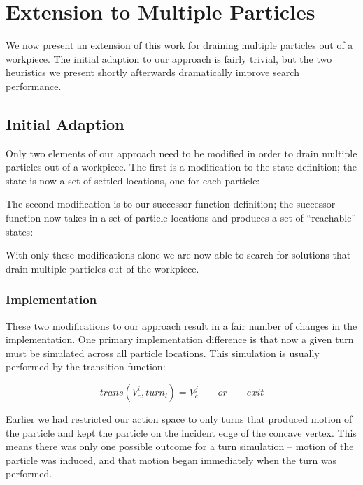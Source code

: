 \chapter{Extension to Multiple Particles}

We now present an extension of this work for draining multiple particles out of a workpiece. The initial adaption to our approach is fairly trivial, but the two heuristics we present shortly afterwards dramatically improve search performance.

\section{Initial Adaption}

Only two elements of our approach need to be modified in order to drain multiple particles out of a workpiece. The first is a modification to the state definition; the state is now a set of settled locations, one for each particle:

 {
  \label{eq:multipleParticleState}
}

The second modification is to our successor function definition; the successor function now takes in a set of particle locations and produces a set of ``reachable'' states:

 {
  \label{eq:successorMultipleParticle}
}

With only these modifications alone we are now able to search for solutions that drain multiple particles out of the workpiece.

\subsection{Implementation}

These two modifications to our approach result in a fair number of changes in the implementation. One primary implementation difference is that now a given turn must be simulated across all particle locations. This simulation is usually performed by the transition function:

$$
trans(V_{c}^{i}, turn_{l}) = V_{c}^j \qquad or \qquad exit
$$

Earlier we had restricted our action space to only turns that produced motion of the particle and kept the particle on the incident edge of the concave vertex. This means there was only one possible outcome for a turn simulation -- motion of the particle was induced, and that motion began immediately when the turn was performed.

